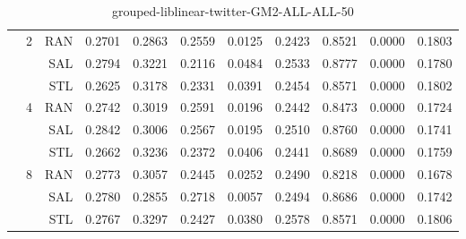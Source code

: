 \begin{center}
\begin{table}[htbp]
\begin{tabular}{ | r | r | r | r | r | r | r | r | r | r | r |}
 & \multirow{3}{*}{2} & RAN & 0.2701 & 0.2863 & 0.2559 & 0.0125 & 0.2423 & 0.8521 & 0.0000 & 0.1803\\ \cline{3-11}
 &   & SAL & 0.2794 & 0.3221 & 0.2116 & 0.0484 & 0.2533 & 0.8777 & 0.0000 & 0.1780\\ \cline{3-11}
 &   & STL & 0.2625 & 0.3178 & 0.2331 & 0.0391 & 0.2454 & 0.8571 & 0.0000 & 0.1802\\ \cline{2-11}
 & \multirow{3}{*}{4} & RAN & 0.2742 & 0.3019 & 0.2591 & 0.0196 & 0.2442 & 0.8473 & 0.0000 & 0.1724\\ \cline{3-11}
 &   & SAL & 0.2842 & 0.3006 & 0.2567 & 0.0195 & 0.2510 & 0.8760 & 0.0000 & 0.1741\\ \cline{3-11}
 &   & STL & 0.2662 & 0.3236 & 0.2372 & 0.0406 & 0.2441 & 0.8689 & 0.0000 & 0.1759\\ \cline{2-11}
 & \multirow{3}{*}{8} & RAN & 0.2773 & 0.3057 & 0.2445 & 0.0252 & 0.2490 & 0.8218 & 0.0000 & 0.1678\\ \cline{3-11}
 &   & SAL & 0.2780 & 0.2855 & 0.2718 & 0.0057 & 0.2494 & 0.8686 & 0.0000 & 0.1742\\ \cline{3-11}
 &   & STL & 0.2767 & 0.3297 & 0.2427 & 0.0380 & 0.2578 & 0.8571 & 0.0000 & 0.1806\\ \cline{2-11}
\hline
\end{tabular}
\caption{grouped-liblinear-twitter-GM2-ALL-ALL-50}
\end{table}
\end{center}

